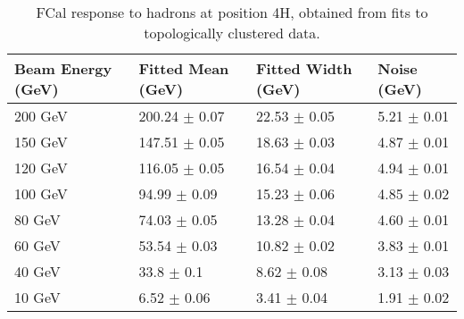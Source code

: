 \begin{table}
\begin{center}
\begin{tabular}[!htb]{|l|l|l|l|}
\hline
Beam Energy (GeV) & Fitted Mean (GeV)& Fitted Width (GeV)& Noise (GeV) \\
\hline
200 GeV  &  200.24 $\pm$    0.07 &   22.53 $\pm$    0.05 &    5.21 $\pm$    0.01 \\
150 GeV  &  147.51 $\pm$    0.05 &   18.63 $\pm$    0.03 &    4.87 $\pm$    0.01 \\
120 GeV  &  116.05 $\pm$    0.05 &   16.54 $\pm$    0.04 &    4.94 $\pm$    0.01 \\
100 GeV  &   94.99 $\pm$    0.09 &   15.23 $\pm$    0.06 &    4.85 $\pm$    0.02 \\
 80 GeV  &   74.03 $\pm$    0.05 &   13.28 $\pm$    0.04 &    4.60 $\pm$    0.01 \\
 60 GeV  &   53.54 $\pm$    0.03 &   10.82 $\pm$    0.02 &    3.83 $\pm$    0.01 \\
 40 GeV  &   33.8  $\pm$    0.1  &    8.62 $\pm$    0.08 &    3.13 $\pm$    0.03 \\
 10 GeV  &    6.52 $\pm$    0.06 &    3.41 $\pm$    0.04 &    1.91 $\pm$    0.02 \\

\hline
\end{tabular}
\caption{FCal response to hadrons at position 4H, obtained from fits to topologically clustered data.}
\label{table_hadron_response_t420_4H}
\end{center}
\end{table}

